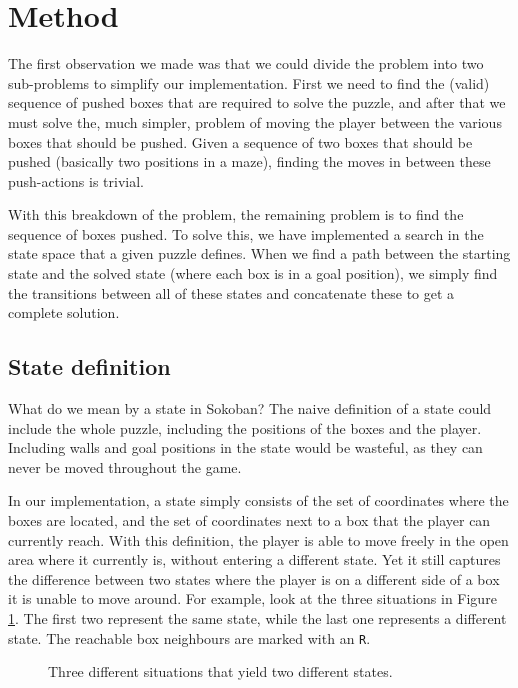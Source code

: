 \documentclass[a4paper,11pt]{article}
\begin{document}
\section{Method}

The first observation we made was that we could divide the problem into two sub-problems
to simplify our implementation.
First we need to find the (valid) sequence of pushed boxes that are required to solve
the puzzle, and after that we must solve the, much simpler, problem of moving the player
between the various boxes that should be pushed.
Given a sequence of two boxes that should be pushed (basically two positions in a maze),
finding the moves in between these push-actions is trivial.

With this breakdown of the problem, the remaining problem is to find the
sequence of boxes pushed.
To solve this, we have implemented a search in the state space that a given puzzle defines.
When we find a path between the starting state and the solved state (where each box is in a goal position),
we simply find the transitions between all of these states and concatenate these to get a complete solution.

\subsection{State definition}
\label{sec:statedef}

What do we mean by a state in Sokoban?
The naive definition of a state could include the whole puzzle,
including the positions of the boxes and the player.
Including walls and goal positions in the state would be wasteful,
as they can never be moved throughout the game.

In our implementation, a state simply consists of the set of coordinates where the boxes are located,
and the set of coordinates next to a box that the player can currently reach.
With this definition, the player is able to move freely in the
open area where it currently is, without entering a different state.
Yet it still captures the difference between two states where the player is on a different side of a
box it is unable to move around.
For example, look at the three situations in Figure \ref{example:states}.
The first two represent the same state,
while the last one represents a different state.
The reachable box neighbours are marked with an \verb!R!.

\begin{figure}[h!]
	\centering
\begin{center}
\end{center}
	\label{example:states}
	\caption{
		Three different situations that yield two different states.
	}
\end{figure}
\end{document}
